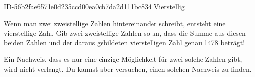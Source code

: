\begin{exercise}
      {ID-56b2fae6571e0d235ccd00ea0cb7da2d111bc834}
      {Vierstellig}
  \ifproblem\problem\par
    Wenn man zwei zweistellige Zahlen hintereinander schreibt, entsteht eine
    vierstellige Zahl. Gib zwei zweistellige Zahlen so an, dass die Summe
    aus diesen beiden Zahlen und der daraus gebildeten vierstelligen Zahl
    genau \num{1478} beträgt!\par
    Ein Nachweis, dass es nur eine einzige Möglichkeit für zwei solche Zahlen
    gibt, wird nicht verlangt. Du kannst aber versuchen, einen solchen
    Nachweis zu finden.
  \fi
\end{exercise}
